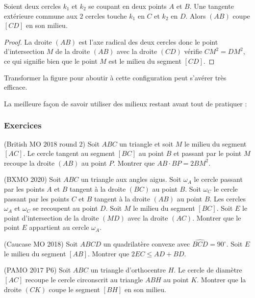 \begin{lem}
Soient deux cercles $k_1$ et $k_2$ se coupant en deux points $A$ et $B$. Une tangente extérieure commune aux $2$ cercles touche $k_1$ en $C$ et $k_2$ en $D$. Alors $(AB)$ coupe $[CD]$ en son milieu.
\end{lem}


\begin{proof}
La droite $(AB)$ est l'axe radical des deux cercles donc le point d'intersection $M$ de la droite $(AB)$ avec la droite $(CD)$ vérifie $CM^2=DM^2$, ce qui signifie bien que le point $M$ est le milieu du segment $[CD]$.
\end{proof}


Transformer la figure pour aboutir à cette configuration peut s'avérer très efficace.

La meilleure façon de savoir utiliser des milieux restant avant tout de pratiquer :


\subsubsection{Exercices}


\begin{exo}
(British MO $2018$ round $2$)
Soit $ABC$ un triangle et soit $M$ le milieu du segment $[AC]$. Le cercle tangent au segment $[BC]$ au point $B$ et passant par le point $M$ recoupe la droite $(AB)$ au point $P$. Montrer que $AB\cdot BP=2BM^2$.
\end{exo}


\begin{exo}
(BXMO 2020) Soit $ABC$ un triangle aux angles aigus. Soit $\omega_A$ le cercle passant par les points $A$ et $B$ tangent à la droite $(BC)$ au point $B$. Soit $\omega_C$ le cercle passant par les points $C$ et $B$ tangent à la droite $(AB)$ au point $B$. Les cercles $\omega_A$ et $\omega_C$ se recoupent au point $D$. Soit $M$ le milieu du segment $[BC]$. Soit $E$ le point d'intersection de la droite $(MD)$ avec la droite $(AC)$. Montrer que le point $E$ appartient au cercle $\omega_A$.
\end{exo}


\begin{exo}
(Caucase MO 2018) Soit $ABCD$ un quadrilatère convexe avec $\widehat{BCD}=90^\circ$. Soit $E$ le milieu du segment $[AB]$. Montrer que $2EC\leq AD+BD$.
\end{exo}


\begin{exo}
(PAMO $2017$ P$6$)
Soit $ABC$ un triangle d'orthocentre $H$. Le cercle de diam\`etre $[AC]$ recoupe le cercle circonscrit au triangle $ABH$ au point $K$. Montrer que la droite $(CK)$ coupe le segment $[BH]$ en son milieu.
\end{exo}


